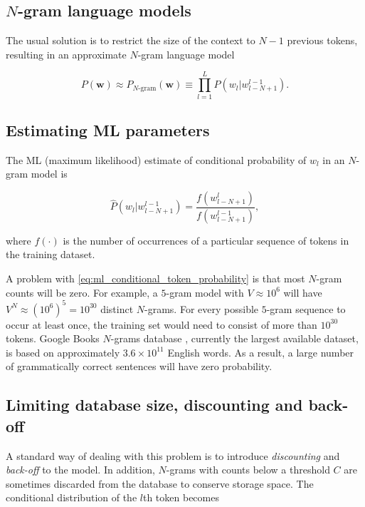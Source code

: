 \documentclass[draft]{IIBproject}
\begin{document}
\subsection{$N$-gram language models}

The usual solution is to restrict the size of the context to $N{-}1$ previous tokens, resulting in an approximate $N$-gram language model

\begin{equation}
\label{eq:ngram_string_probability}
P(\mathbf w) \approx P_{\text{$N$-gram}}(\mathbf w) \equiv \prod_{l=1}^{L} P( w_l | w_{l-N+1}^{l-1} ).
\end{equation}

\subsection{Estimating ML parameters}

The ML (maximum likelihood) estimate of conditional probability of $w_l$ in an $N$-gram model is

\begin{equation}
\label{eq:ml_conditional_token_probability}
\hat P( w_l | w_{l-N+1}^{l-1} ) = \frac {f(w_{l-N+1}^l)} {f(w_{l-N+1}^{l-1})},
\end{equation}

where $f(\cdot)$ is the number of occurrences of a particular sequence of tokens in the training dataset.

A problem with \cref{eq:ml_conditional_token_probability} is that most $N$-gram counts will be zero. For example, a $5$-gram model with $V \approx 10^6$ will have $V^N \approx \left( 10^6 \right)^5 = 10^{30}$ distinct $N$-grams. For every possible $5$-gram sequence to occur at least once, the training set would need to consist of more than $10^{30}$ tokens. Google Books $N$-grams database \cite{googlengrams2011}, currently the largest available dataset, is based on approximately $3.6 \times 10^{11}$ English words. As a result, a large number of grammatically correct sentences will have zero probability.

\subsection{Limiting database size, discounting and back-off}

A standard way of dealing with this problem is to introduce \emph{discounting} and \emph{back-off} to the model. In addition, $N$-grams with counts below a threshold $C$ are sometimes discarded from the database to conserve storage space. The conditional distribution of the $l$th token becomes
\end{document}
